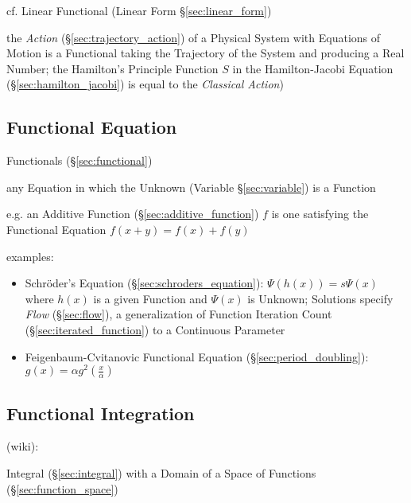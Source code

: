 \fist cf. Linear Functional (Linear Form \S\ref{sec:linear_form})

the \emph{Action} (\S\ref{sec:trajectory_action}) of a Physical System with
Equations of Motion is a Functional taking the Trajectory of the System and
producing a Real Number; the Hamilton's Principle Function $S$ in the
Hamilton-Jacobi Equation (\S\ref{sec:hamilton_jacobi}) is equal to the
\emph{Classical Action})



\subsection{Functional Equation}\label{sec:functional_equation}


Functionals (\S\ref{sec:functional})

any Equation in which the Unknown (Variable \S\ref{sec:variable}) is a Function

e.g. an Additive Function (\S\ref{sec:additive_function}) $f$ is one satisfying
the Functional Equation $f(x + y) = f(x) + f(y)$


examples:
\begin{itemize}
  \item Schr\"oder's Equation (\S\ref{sec:schroders_equation}): $\Psi(h(x)) =
    s\Psi(x)$ where $h(x)$ is a given Function and $\Psi(x)$ is Unknown;
    Solutions specify \emph{Flow} (\S\ref{sec:flow}), a generalization of
    Function Iteration Count (\S\ref{sec:iterated_function}) to a Continuous
    Parameter
  \item Feigenbaum-Cvitanovic Functional Equation (\S\ref{sec:period_doubling}):
    $g(x) = \alpha g^2(\frac{x}{\alpha})$
\end{itemize}



\subsection{Functional Integration}\label{sec:functional_integration}

(wiki):

Integral (\S\ref{sec:integral}) with a Domain of a Space of Functions
(\S\ref{sec:function_space})


